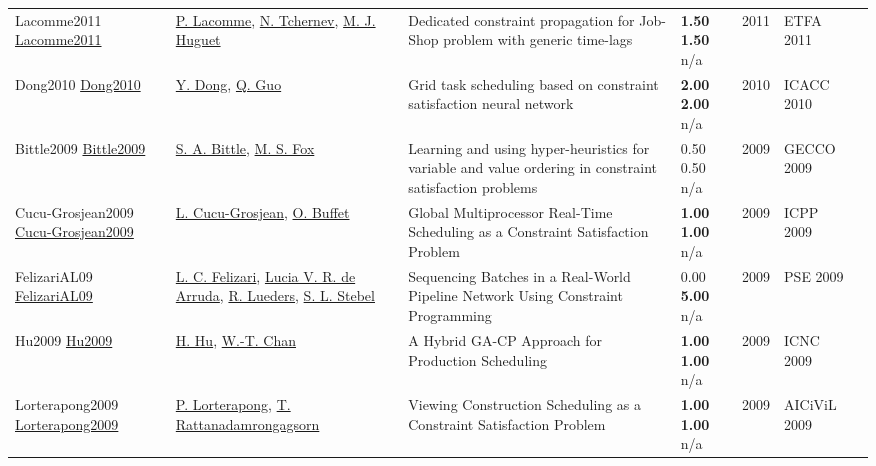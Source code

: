 {\begin{longtable}{p{3cm}p{5cm}p{10cm}p{1cm}rp{2.5cm}l}
Lacomme2011 \href{http://dx.doi.org/10.1109/etfa.2011.6059042}{Lacomme2011} & \hyperref[auth:a1765]{P. Lacomme}, \hyperref[auth:a1766]{N. Tchernev}, \hyperref[auth:a1767]{M. J. Huguet} & Dedicated constraint propagation for Job-Shop problem with generic time-lags & \noindent{}\textbf{1.50} \textbf{1.50} n/a & 2011 & ETFA 2011 & \cite{Lacomme2011}\\
Dong2010 \href{http://dx.doi.org/10.1109/icacc.2010.5487161}{Dong2010} & \hyperref[auth:a1992]{Y. Dong}, \hyperref[auth:a1993]{Q. Guo} & Grid task scheduling based on constraint satisfaction neural network & \noindent{}\textbf{2.00} \textbf{2.00} n/a & 2010 & ICACC 2010 & \cite{Dong2010}\\
Bittle2009 \href{http://dx.doi.org/10.1145/1570256.1570304}{Bittle2009} & \hyperref[auth:a1954]{S. A. Bittle}, \hyperref[auth:a302]{M. S. Fox} & Learning and using hyper-heuristics for variable and value ordering in constraint satisfaction problems & \noindent{}0.50 0.50 n/a & 2009 & GECCO 2009 & \cite{Bittle2009}\\
Cucu-Grosjean2009 \href{http://dx.doi.org/10.1109/icppw.2009.31}{Cucu-Grosjean2009} & \hyperref[auth:a1955]{L. Cucu-Grosjean}, \hyperref[auth:a1956]{O. Buffet} & \cellcolor{green!10}Global Multiprocessor Real-Time Scheduling as a Constraint Satisfaction Problem & \noindent{}\textbf{1.00} \textbf{1.00} n/a & 2009 & ICPP 2009 & \cite{Cucu-Grosjean2009}\\
FelizariAL09 \href{https://www.sciencedirect.com/science/article/pii/S1570794605800136}{FelizariAL09} & \hyperref[auth:a1462]{L. C. Felizari}, \hyperref[auth:a1463]{Lucia V. R. de Arruda}, \hyperref[auth:a1464]{R. Lueders}, \hyperref[auth:a1465]{S. L. Stebel} & Sequencing Batches in a Real-World Pipeline Network Using Constraint Programming & \noindent{}\textcolor{black!50}{0.00} \textbf{5.00} n/a & 2009 & PSE 2009 & \cite{FelizariAL09}\\
Hu2009 \href{http://dx.doi.org/10.1109/icnc.2009.703}{Hu2009} & \hyperref[auth:a1663]{H. Hu}, \hyperref[auth:a2046]{W.-T. Chan} & A Hybrid GA-CP Approach for Production Scheduling & \noindent{}\textbf{1.00} \textbf{1.00} n/a & 2009 & ICNC 2009 & \cite{Hu2009}\\
Lorterapong2009 \href{http://dx.doi.org/10.4203/ccp.74.8}{Lorterapong2009} & \hyperref[auth:a1939]{P. Lorterapong}, \hyperref[auth:a1940]{T. Rattanadamrongagsorn} & Viewing Construction Scheduling as a Constraint Satisfaction Problem & \noindent{}\textbf{1.00} \textbf{1.00} n/a & 2009 & AICiViL 2009 & \cite{Lorterapong2009}\\

\end{longtable}}
